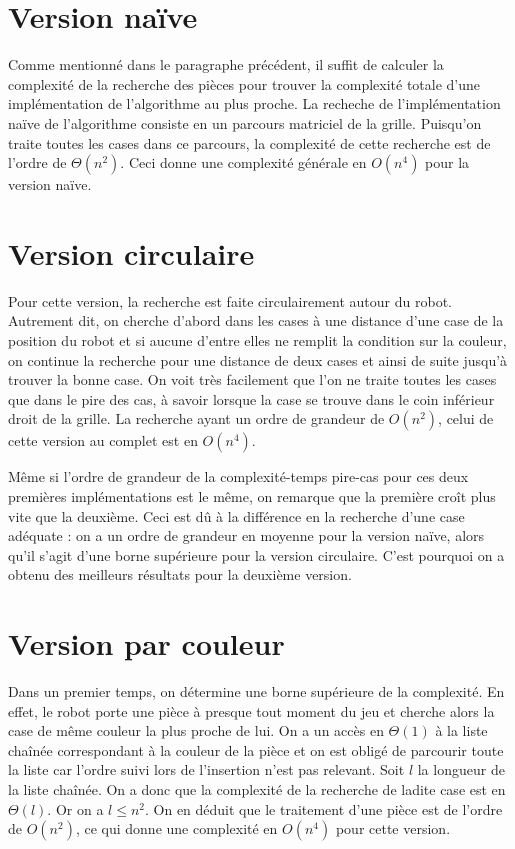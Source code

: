 \documentclass[12pt,a4paper]{article}
\begin{document}
\section{Version na\"ive}
Comme mentionn\'e dans le paragraphe pr\'ec\'edent, il suffit de calculer la 
complexit\'e de la recherche des pi\`eces pour trouver la complexit\'e totale 
d'une impl\'ementation de l'algorithme au plus proche.
La recheche de l'impl\'ementation na\"ive de l'algorithme consiste en un 
parcours matriciel de la grille. Puisqu'on traite toutes les cases dans ce 
parcours, la complexit\'e de cette recherche est de l'ordre de $\Theta(n^2)$. 
Ceci donne une complexit\'e g\'en\'erale en $O(n^4)$ pour la version na\"ive.

\section{Version circulaire}
Pour cette version, la recherche est faite circulairement autour du robot. 
Autrement dit, on cherche d'abord dans les cases \`a une distance d'une case de 
la position du robot et si aucune d'entre elles ne remplit la condition 
sur la couleur, on continue la recherche pour une distance de deux 
cases et ainsi de suite jusqu'\`a trouver la bonne case. On voit tr\`es 
facilement que l'on ne traite toutes les cases que dans le pire des cas, 
\`a savoir lorsque la case se trouve dans le coin inf\'erieur droit de la 
grille. La recherche ayant un ordre de grandeur de $O(n^2)$, celui de cette 
version au complet est en $O(n^4)$.

M\^eme si l'ordre de grandeur de la complexit\'e-temps pire-cas pour ces deux 
premi\`eres impl\'ementations est le m\^eme, on remarque que la premi\`ere 
cro\^it plus 
vite que la deuxi\`eme. Ceci est d\^u \`a la diff\'erence en la recherche d'une 
case ad\'equate : on a un ordre de grandeur en moyenne pour la version na\"ive, 
alors qu'il s'agit d'une borne sup\'erieure pour la version 
circulaire. C'est pourquoi on a obtenu des meilleurs r\'esultats pour la 
deuxi\`eme version.


\section{Version par couleur}
Dans un premier temps, on d\'etermine une borne sup\'erieure de la 
complexit\'e. En effet, le robot porte une pi\`ece \`a presque tout moment du 
jeu et cherche alors la case de m\^eme couleur la plus proche de lui. On a un 
acc\`es en $\Theta(1)$ \`a la liste cha\^in\'ee correspondant \`a la couleur de 
la pi\`ece et on est oblig\'e de parcourir toute la liste car l'ordre suivi lors 
de l'insertion n'est pas relevant. Soit $l$ la longueur de la liste 
cha\^in\'ee. On a donc que la complexit\'e de la recherche de ladite case est en 
$\Theta(l)$. Or on a $l \leq n^2$. On en d\'eduit que le traitement d'une 
pi\`ece est de l'ordre de $O(n^2)$, ce qui donne une complexit\'e en $O(n^4)$ 
pour cette version. 
\end{document}
